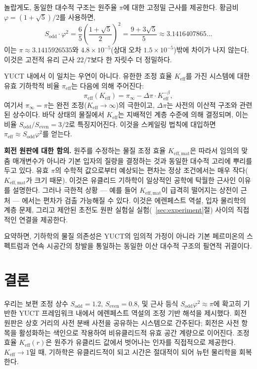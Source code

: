 \documentclass[12pt,a4paper]{article}
\newcommand{\Sodd}{S_{\mathrm{odd}}}
\newcommand{\Seven}{S_{\mathrm{even}}}
\begin{document}
	놀랍게도, 동일한 대수적 구조는 원주율 \(\pi\)에 대한 고정밀 근사를 제공한다. 황금비 \(\varphi = (1+\sqrt{5})/2\)를 사용하면,
	\begin{equation}
		S_{\mathrm{odd}} \cdot \varphi^2 = \frac{6}{5} \left( \frac{1+\sqrt{5}}{2} \right)^2 
		= \frac{9+3\sqrt{5}}{5} \approx 3.1416407865\dots
	\end{equation}
	이는 \(\pi \approx 3.1415926535\)와 \(4.8\times10^{-5}\)(상대 오차 \(1.5\times10^{-5}\))밖에 차이가 나지 않는다. 이것은 고전적 유리 근사 \(22/7\)보다 한 자릿수 더 정밀하다.
	
	YUCT 내에서 이 일치는 우연이 아니다. 유한한 조정 효율 \(K_{\mathrm{eff}}\)를 가진 시스템에 대한 유효 기하학적 비율 \(\pi_{\mathrm{eff}}\)는 다음에 의해 주어진다:
	\begin{equation}
		\pi_{\mathrm{eff}}(K_{\mathrm{eff}}) = \pi_{\infty} - \Delta\pi \cdot K_{\mathrm{eff}}^{-\beta},
	\end{equation}
	여기서 \(\pi_{\infty} = \pi\)는 완전 조정(\(K_{\mathrm{eff}} \to \infty\))의 극한이고, \(\Delta\pi\)는 사전의 이산적 구조와 관련된 상수이다. 바닥 상태의 물질에서 \(K_{\mathrm{eff}}\)는 지배적인 계층 수준에 의해 결정되며, 이는 비율 \(S_{\mathrm{odd}}/S_{\mathrm{even}} = 3/2\)로 특징지어진다. 이것을 스케일링 법칙에 대입하면 \(\pi_{\mathrm{eff}} \approx S_{\mathrm{odd}}\varphi^2\)를 얻는다.
	
	\textbf{회전 원판에 대한 함의.}
	원주를 수정하는 물질 조정 효율 \(K_{\mathrm{eff,mat}}\)은 따라서 임의의 맞춤 매개변수가 아니라 기본 입자의 질량을 결정하는 것과 동일한 대수적 고리에 뿌리를 두고 있다. 유효 \(\pi\)의 수학적 값으로부터 예상되는 편차는 정상 조건에서는 매우 작다(\(K_{\mathrm{eff,mat}}\)가 크기 때문). 이것은 유클리드 기하학이 일상적인 공학에 탁월한 근사인 이유를 설명한다. 그러나 극한적 상황 — 예를 들어 \(K_{\mathrm{eff,mat}}\)이 급격히 떨어지는 상전이 근처 — 에서는 편차가 검출 가능해질 수 있다. 이것은 에렌페스트 역설, 입자 물리학의 계층 문제, 그리고 제안된 초전도 원판 실험실 실험(~\ref{sec:experiment}절) 사이의 직접적인 연결을 제공한다.
	
	요약하면, 기하학의 물질 의존성은 YUCT의 임의적 가정이 아니라 기본 페르미온의 스펙트럼과 연속 시공간의 창발을 통일하는 동일한 이산 대수적 구조의 필연적 귀결이다.
	
	\section{결론}
	\label{sec:conclusion}
	
	우리는 보편 조정 상수 \(\Sodd = 1.2\), \(\Seven = 0.8\), 및 근사 등식 \(\Sodd \varphi^2 \approx \pi\)에 확고히 기반한 YUCT 프레임워크 내에서 에렌페스트 역설의 조정 기반 해석을 제시했다. 회전 원판은 상호 거리의 사전 분배 사전을 공유하는 시스템으로 간주된다; 회전은 사전 항목을 활성화하는 색인으로 작용하여 비유클리드적 유효 공간 계량으로 이어진다. 조정 효율 \(K_{\mathrm{eff}}(r)\)은 원주가 유클리드 값에서 벗어나는 인자를 직접적으로 제공한다. \(K_{\mathrm{eff}} \to 1\)일 때, 기하학은 유클리드적이 되고 시간은 절대적이 되어 뉴턴 물리학을 회복한다.
	
\end{document}
